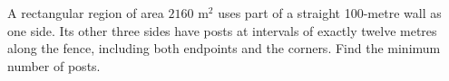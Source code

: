 A rectangular region of area $2160\text{ m}^2$ uses part of a straight 100-metre wall as one side. Its other three sides have posts at intervals of exactly twelve metres along the fence, including both endpoints and the corners. Find the minimum number of posts.
